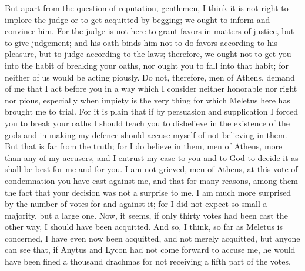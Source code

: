 But apart from the question of reputation, gentlemen, I think it is not right  to implore the judge or to get acquitted by begging; we ought to inform and convince him. For the judge is not here to grant favors in matters of justice, but to give judgement; and his oath binds him not to do favors according to his pleasure, but to judge according to the laws; therefore, we ought not to get you into the habit of breaking your oaths, nor ought you to fall into that habit; for neither of us would be acting piously. Do not, therefore, men of Athens, demand of me that I act before you in a way which I consider neither honorable nor right nor pious,  especially when impiety is the very thing for which Meletus here has brought me to trial. For it is plain that if by persuasion and supplication I forced you to break your oaths I should teach you to disbelieve in the existence of the gods and in making my defence should accuse myself of not believing in them. But that is far from the truth; for I do believe in them, men of Athens, more than any of my accusers, and I entrust my case to you and to God to decide it as shall be best for me and for you.  I am not grieved, men of Athens,  at this vote of condemnation you have cast against me, and that for many reasons, among them the fact that your decision was not a surprise to me. I am much more surprised by the number of votes for and against it; for I did not expect so small a majority, but a large one. Now, it seems, if only thirty votes had been cast the other way, I should have been acquitted. And so, I think, so far as Meletus is concerned, I have even now been acquitted, and not merely acquitted, but anyone can see that, if Anytus and Lycon had not come forward to accuse me, he would have been fined  a thousand drachmas for not receiving a fifth part of the votes.

